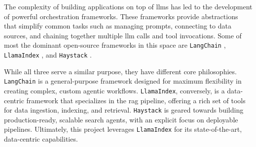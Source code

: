 The complexity of building applications on top of \acp{llm} has led to the development of powerful orchestration frameworks. These frameworks provide abstractions that simplify common tasks such as managing prompts, connecting to data sources, and chaining together multiple \ac{llm} calls and tool invocations. Some of most the dominant open-source frameworks in this space are \texttt{LangChain} \cite{LANGCHAIN}, \texttt{LlamaIndex} \cite{LLAMAINDEX}, and \texttt{Haystack} \cite{HAYSTACK}.

While all three serve a similar purpose, they have different core philosophies. \texttt{LangChain} is a general-purpose framework designed for maximum flexibility in creating complex, custom agentic workflows. \texttt{LlamaIndex}, conversely, is a data-centric framework that specializes in the \ac{rag} pipeline, offering a rich set of tools for data ingestion, indexing, and retrieval. \texttt{Haystack} is geared towards building production-ready, scalable search agents, with an explicit focus on deployable pipelines. Ultimately, this project leverages \texttt{LlamaIndex} for its state-of-the-art, data-centric capabilities.